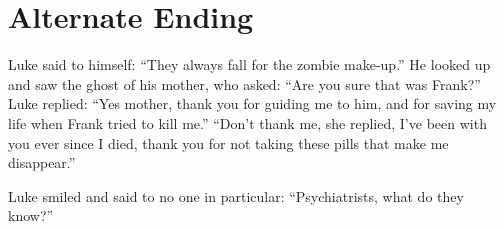 \section*{Alternate Ending}

Luke said to himself: ``They always fall for the zombie
make-up.'' He looked up and saw the ghost of his mother, who
asked: ``Are you sure that was Frank?'' Luke replied:
``Yes mother, thank you for guiding me to him, and for saving
my life when Frank tried to kill me.'' ``Don't
thank me, she replied, I've been with you ever since I died,
thank you for not taking these pills that make me
disappear.''

Luke smiled and said to no one in particular: ``Psychiatrists,
what do they know?''

